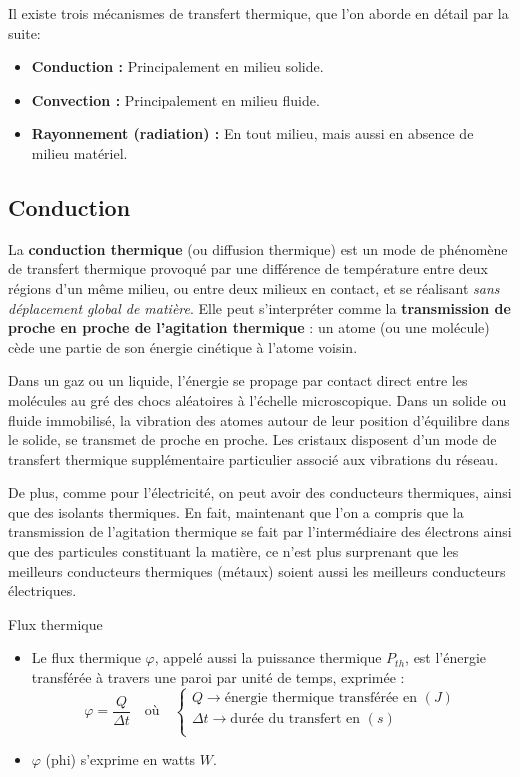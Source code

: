 \documentclass[11pt,a4paper]{article}
\begin{document}
Il existe trois mécanismes de transfert thermique, que l'on aborde en détail par la suite: 
\begin{itemize}
    \item \textbf{Conduction : }Principalement en milieu solide. 
    \item \textbf{Convection : }Principalement en milieu fluide. 
    \item \textbf{Rayonnement (radiation) : }En tout milieu, mais aussi en absence de milieu matériel. 
\end{itemize}

\subsection{Conduction}

La \textbf{conduction thermique} (ou diffusion thermique) est un mode de phénomène de transfert thermique provoqué par une différence de température entre deux régions d'un même milieu, ou entre deux milieux en contact, et se réalisant \textit{sans déplacement global de matière}. Elle peut s'interpréter comme la \textbf{transmission de proche en proche de l'agitation thermique} : un atome (ou une molécule) cède une partie de son énergie cinétique à l'atome voisin.

Dans un gaz ou un liquide, l'énergie se propage par contact direct entre les molécules au gré des chocs aléatoires à l'échelle microscopique. Dans un solide ou fluide immobilisé, la vibration des atomes autour de leur position d'équilibre dans le solide, se transmet de proche en proche. Les cristaux disposent d'un mode de transfert thermique supplémentaire particulier associé aux vibrations du réseau.

De plus, comme pour l’électricité, on peut avoir des conducteurs thermiques, ainsi que des isolants thermiques.  En fait, maintenant que l’on a compris que la transmission de l’agitation thermique se fait par l’intermédiaire des électrons ainsi que des particules constituant la matière, ce n’est plus surprenant que les meilleurs conducteurs thermiques (métaux)  soient aussi les meilleurs conducteurs électriques. 

\begin{defn}{Flux thermique}
\begin{itemize}
    \item Le flux thermique $\varphi$, appelé aussi la puissance thermique $P_{th}$, est l’énergie transférée à travers une paroi par unité de temps, exprimée : 
\[ \varphi = \dfrac{Q}{\Delta t}   \quad \text{où} \quad
\begin{cases}
    Q \rightarrow \text{énergie thermique transférée en }(J) \\
    \Delta t \rightarrow \text{durée du transfert en }(s) \\ 
\end{cases}
\]
    \item $\varphi$ (phi) s’exprime en watts $W$.
\end{itemize}
\end{defn}
\end{document}
